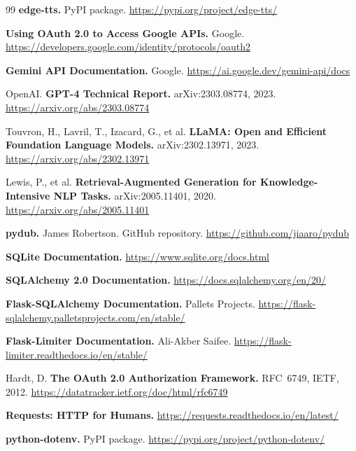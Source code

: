 \begin{thebibliography}{99}
\textbf{edge-tts.} PyPI package.
\newblock \url{https://pypi.org/project/edge-tts/}

\textbf{Using OAuth 2.0 to Access Google APIs.} Google.
\newblock \url{https://developers.google.com/identity/protocols/oauth2}

\textbf{Gemini API Documentation.} Google.
\newblock \url{https://ai.google.dev/gemini-api/docs}

OpenAI.
\newblock \textbf{GPT-4 Technical Report.} arXiv:2303.08774, 2023.
\newblock \url{https://arxiv.org/abs/2303.08774}

Touvron, H., Lavril, T., Izacard, G., et al.
\newblock \textbf{LLaMA: Open and Efficient Foundation Language Models.} arXiv:2302.13971, 2023.
\newblock \url{https://arxiv.org/abs/2302.13971}

Lewis, P., et al.
\newblock \textbf{Retrieval-Augmented Generation for Knowledge-Intensive NLP Tasks.} arXiv:2005.11401, 2020.
\newblock \url{https://arxiv.org/abs/2005.11401}

\textbf{pydub.} James Robertson.
\newblock GitHub repository.
\newblock \url{https://github.com/jiaaro/pydub}

\textbf{SQLite Documentation.}
\newblock \url{https://www.sqlite.org/docs.html}

\textbf{SQLAlchemy 2.0 Documentation.}
\newblock \url{https://docs.sqlalchemy.org/en/20/}

\textbf{Flask-SQLAlchemy Documentation.} Pallets Projects.
\newblock \url{https://flask-sqlalchemy.palletsprojects.com/en/stable/}

\textbf{Flask-Limiter Documentation.} Ali-Akber Saifee.
\newblock \url{https://flask-limiter.readthedocs.io/en/stable/}

Hardt, D.
\newblock \textbf{The OAuth 2.0 Authorization Framework.} RFC~6749, IETF, 2012.
\newblock \url{https://datatracker.ietf.org/doc/html/rfc6749}

\textbf{Requests: HTTP for Humans.}
\newblock \url{https://requests.readthedocs.io/en/latest/}

\textbf{python-dotenv.} PyPI package.
\newblock \url{https://pypi.org/project/python-dotenv/}


\end{thebibliography}
